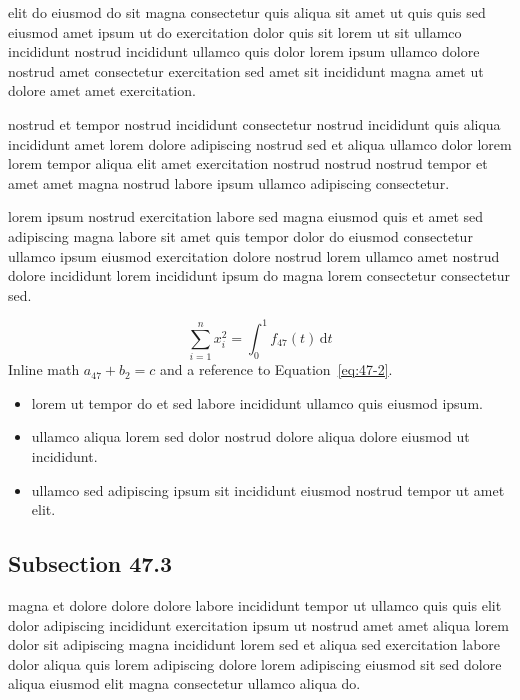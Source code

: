 \documentclass{article}
\begin{document}
elit do eiusmod do sit magna consectetur quis aliqua sit amet ut quis quis sed eiusmod amet ipsum ut do exercitation dolor quis sit lorem ut sit ullamco incididunt nostrud incididunt ullamco quis dolor lorem ipsum ullamco dolore nostrud amet consectetur exercitation sed amet sit incididunt magna amet ut dolore amet amet exercitation.

nostrud et tempor nostrud incididunt consectetur nostrud incididunt quis aliqua incididunt amet lorem dolore adipiscing nostrud sed et aliqua ullamco dolor lorem lorem tempor aliqua elit amet exercitation nostrud nostrud nostrud tempor et amet amet magna nostrud labore ipsum ullamco adipiscing consectetur.

lorem ipsum nostrud exercitation labore sed magna eiusmod quis et amet sed adipiscing magna labore sit amet quis tempor dolor do eiusmod consectetur ullamco ipsum eiusmod exercitation dolore nostrud lorem ullamco amet nostrud dolore incididunt lorem incididunt ipsum do magna lorem consectetur consectetur sed.

\begin{equation}\label{eq:47-2}
  \sum_{i=1}^{n} x_i^{2} = \int_0^1 f_{47}(t)\,\mathrm{d}t
\end{equation}
Inline math $a_{47} + b_{2} = c$ and a reference to Equation~\eqref{eq:47-2}.

\begin{itemize}
  \item lorem ut tempor do et sed labore incididunt ullamco quis eiusmod ipsum.
  \item ullamco aliqua lorem sed dolor nostrud dolore aliqua dolore eiusmod ut incididunt.
  \item ullamco sed adipiscing ipsum sit incididunt eiusmod nostrud tempor ut amet elit.
\end{itemize}

\subsection{Subsection 47.3}\label{sec:47-3}
magna et dolore dolore dolore labore incididunt tempor ut ullamco quis quis elit dolor adipiscing incididunt exercitation ipsum ut nostrud amet amet aliqua lorem dolor sit adipiscing magna incididunt lorem sed et aliqua sed exercitation labore dolor aliqua quis lorem adipiscing dolore lorem adipiscing eiusmod sit sed dolore aliqua eiusmod elit magna consectetur ullamco aliqua do.
\end{document}
